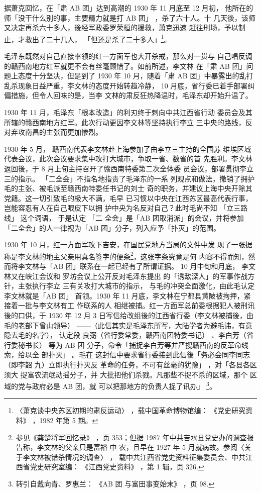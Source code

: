 据萧克回忆，在「肃 AB 团」达到高潮的 1930 年 11 月底至 12 月初，
他所在的师「没干什么别的事，主要精力就是打 AB 团」
，杀了六十人。十
几天後，该师又决定再杀六十多人，後经军政委罗荣桓的援救，萧克迅速
赶往刑场，予以制止，才救出了二十几人，
「但还是杀了二十多人」\footnote{〈萧克谈中央苏区初期的肃反运动〉
，载中国革命博物馆编：
《党史研究资料》
，1982 年第 5 期。}。 

毛泽东既然对自己直接率领的红一方面军也大开杀戒，那么对一贯与
自己唱反调的赣西南地方红军就更不会有丝毫顾惜了。如前所述，李文林
在「肃 AB 团」问题上态度十分坚决，但是到了 1930 年 10 月，随着「肃
AB 团」中暴露出的乱打乱杀现象日益严重，李文林的态度开始转趋冷静，
10 月底，省行委已着手部署纠偏措施，但令人回味的是，当李
文林的肃反狂热降温时，毛泽东却开始升温了。

1930 年 11 月，毛泽东「根本改造」的利刃终于刺向中共江西省行动
委员会及其所辖的赣西南地方红军。此次行动更因李文林等坚持执行李立
三中央的路线，反对弃攻南昌的主张而更加惨烈。

1930 年 5 月，
赣西南代表李文林赴上海参加了由李立三主持的全国苏
维埃区域代表会议，此次会议要求集中攻打大城市，争取一省、数省的首
先胜利。李文林返回後，于 8 月上旬主持召开了赣西南特委第二次全体委
员会议，部署贯彻李立三的指示。
「二全会」不指名地指责了毛泽东的一系
列观点和做法，撤销了拥护毛的主张、被毛派至赣西南特委任书记的刘士
奇的职务，并建议上海中央开除其党籍。这一切引致毛的极大不满，毛早
已习惯以中央在江西苏区最高代表行事，岂能容忍有人在自己眼皮下以拥
护中央为名反对自己？此时毛尚不知
「立三路线」
这个词语，
于是认定
「二
全会」是「AB 团取消派」的会议，并将参加「二全会」的人一律视为「AB
团」分子，列入应予「扑灭」的范围。

1930 年 10 月，红一方面军攻下吉安，在国民党地方当局的文件中发 现了一张据
称是李文林的地主父亲用真名签字的便条\footnote{ 参见《龚楚将军回忆录》
，页 353；但据 1987 年中共吉水县党史办的调查报告称，李文林的父亲只是富裕
中 农，且早在 1927 年 5 月就病故。参阅〈关于李文林被错杀情况的调查〉 ，
载中共江西省党史资料征集委员会、中共江 西省党史研究室编： 《江西党史资料》
，第 1 辑，页 326.  }，这张字条究竟是何 内容不得而知，然而将李文林与「AB
团」联系在一起已经有了所谓证据。 10 月中旬和月底， 李文林又在峡江会议和
罗坊会议上公开反对毛泽东提出 的「诱敌深人」的军事作战方针，主张执行李立
三有关攻打大城市的指示， 与毛的冲突全面激化，由此毛认定李文林就是「AB 团」
首领。1930 年 11 月底，李文林在宁都县黄陂被拘押，紧接着一批与李文林有工
作联系的人 相继被捕。红一方面军总前委根据犯人被刑讯後的口供，于 1930 年
12 月 3 日写信给改组後的江西省行委（李文林被捕後，由毛的老部下曾山领导）
——（此信其实是毛泽东所写，大陆学者为避毛讳，有意隐去毛的名字）， 认定段
良弼（省行委常委，赣西南团特委书记） 、李白芳（省行委秘书长） 等为 AB 团
分子，命令「捕捉李白芳等并严搜赣西南的反革命线索，给以全 部扑灭」 。毛在
这封信中要求省行委接到此信後「务必会同李同志（即李韶 九）立即执行扑灭反
革命的任务，不可有丝毫的犹豫」 ，对「各县各区须大 捉富农流氓动摇分子，并
大批把他们杀戮。凡那些不捉不杀的区域，那个 区域的党与政府必是 AB 团，就
可以把那地方的负责人捉了讯办」 \footnote{ 转引自戴向青、罗惠兰： 《AB 团
与富田事变始末》 ，页 98.}。



